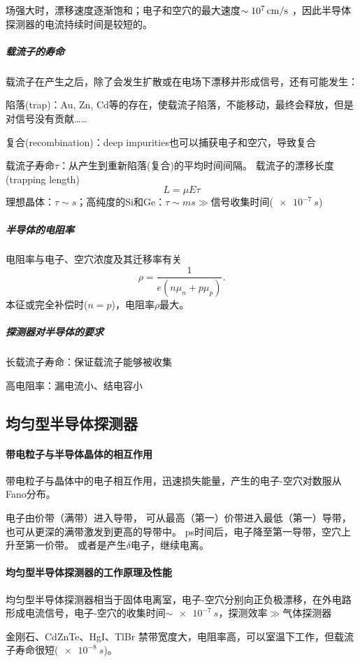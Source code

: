 场强大时，漂移速度逐渐饱和；电子和空穴的最大速度$\sim\SI{E7}{cm/s}$%
，因此半导体探测器的电流持续时间是较短的。
\subparagraph{载流子的寿命}
载流子在产生之后，除了会发生扩散或在电场下漂移并形成信号，还有可能发生：
\begin{compactitem}
	\item 陷落(trap)：Au, Zn, Cd等的存在，使载流子陷落，不能移动，最终会释放，但是对信号没有贡献……
	\item 复合(recombination)：deep impurities也可以捕获电子和空穴，导致复合%
\end{compactitem}
载流子寿命$\tau$：从产生到重新陷落(复合)的平均时间间隔。
载流子的漂移长度(trapping length)
\[
	L=\mu E\tau
\]
理想晶体：$\tau\sim\si{s}$；高纯度的Si和Ge：$\tau\sim\si{ms}\gg$信号收集时间($\SI{e-7}{s}$)
\subparagraph{半导体的电阻率}
电阻率与电子、空穴浓度及其迁移率有关
\[
	\rho=\frac1{e(n\mu_n+p\mu_p)}.
\]
本征或完全补偿时($n=p$)，电阻率$\rho$最大。
\subparagraph{探测器对半导体的要求}
\begin{compactenum}
	\item 长载流子寿命：保证载流子能够被收集
	\item 高电阻率：漏电流小、结电容小
\end{compactenum}
\subsection{均匀型半导体探测器}
\paragraph{带电粒子与半导体晶体的相互作用}
带电粒子与晶体中的电子相互作用，迅速损失能量，产生的电子-空穴对数服从Fano分布。

电子由价带（满带）进入导带，
可从最高（第一）价带进入最低（第一）导带，
也可从更深的满带激发到更高的导带中。
ps时间后，电子降至第一导带，空穴上升至第一价带。
或者是产生$\delta$电子，继续电离。
\paragraph{均匀型半导体探测器的工作原理及性能}
均匀型半导体探测器相当于固体电离室，电子-空穴分别向正负极漂移，在外电路形成电流信号，电子-空穴的收集时间$\sim\SI{e-7}{s}$，探测效率$\gg$气体探测器

金刚石、CdZnTe、HgI、TlBr
禁带宽度大，电阻率高，可以室温下工作，但载流子寿命很短($\SI{e-8}{s}$)。


